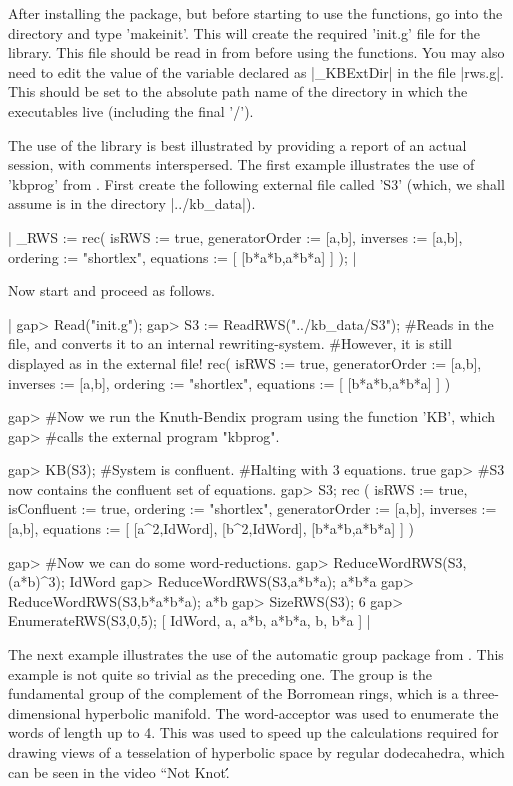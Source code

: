 After installing the package, but before starting to use the {\GAP} functions,
go into the {\GAP} directory and type 'makeinit'. This will create the
required 'init.g' file for the {\GAP} library.
This file should be read in from {\GAP} before using the functions.
You may also need to edit the value of the variable declared as
|_KBExtDir| in the file |rws.g|. This should be set to the absolute path
name of the directory in which the {\KBMAG} executables live (including the
final '/'). 

The use of the library is best illustrated by providing a report of an
actual session, with comments interspersed.
The first example illustrates the use of 'kbprog' from {\GAP}.
First create the following external file called 'S3' (which, we shall assume
is in the directory |../kb_data|).

|
_RWS := rec(
           isRWS := true,
  generatorOrder := [a,b],
        inverses := [a,b],
        ordering := "shortlex",
       equations := [
         [b*a*b,a*b*a]
       ]
);
|

Now start {\GAP} and proceed as follows.

|
gap> Read("init.g");
gap> S3 := ReadRWS("../kb_data/S3");
#Reads in the file, and converts it to an internal rewriting-system.
#However, it is still displayed as in the external file!
rec(
           isRWS := true,
  generatorOrder := [a,b],
        inverses := [a,b],
        ordering := "shortlex",
       equations := [
         [b*a*b,a*b*a]
       ]
)

gap> #Now we run the Knuth-Bendix program using the function 'KB', which
gap> #calls the external program "kbprog".

gap> KB(S3);
#System is confluent.
#Halting with 3 equations.
true
gap> #S3 now contains the confluent set of equations.
gap> S3;
rec (
           isRWS := true,
     isConfluent := true,
        ordering := "shortlex",
  generatorOrder := [a,b],
        inverses := [a,b],
       equations := [
         [a^2,IdWord],
         [b^2,IdWord],
         [b*a*b,a*b*a]
       ]
)

gap> #Now we can do some word-reductions.
gap> ReduceWordRWS(S3,(a*b)^3);
IdWord
gap> ReduceWordRWS(S3,a*b*a);
a*b*a
gap> ReduceWordRWS(S3,b*a*b*a);
a*b
gap> SizeRWS(S3);
6
gap> EnumerateRWS(S3,0,5);
[ IdWord, a, a*b, a*b*a, b, b*a ]
|

The next example illustrates the use of the automatic group package from {\GAP}.
This example is not quite so trivial as the preceding one. The group is the
fundamental group of the complement of the Borromean rings, which is a
three-dimensional hyperbolic manifold. The word-acceptor was used to enumerate
the words of length up to 4. This was used to speed up the calculations
required for drawing views of a tesselation of hyperbolic space by regular
dodecahedra, which can be seen in the video ``Not Knot\'\'.


